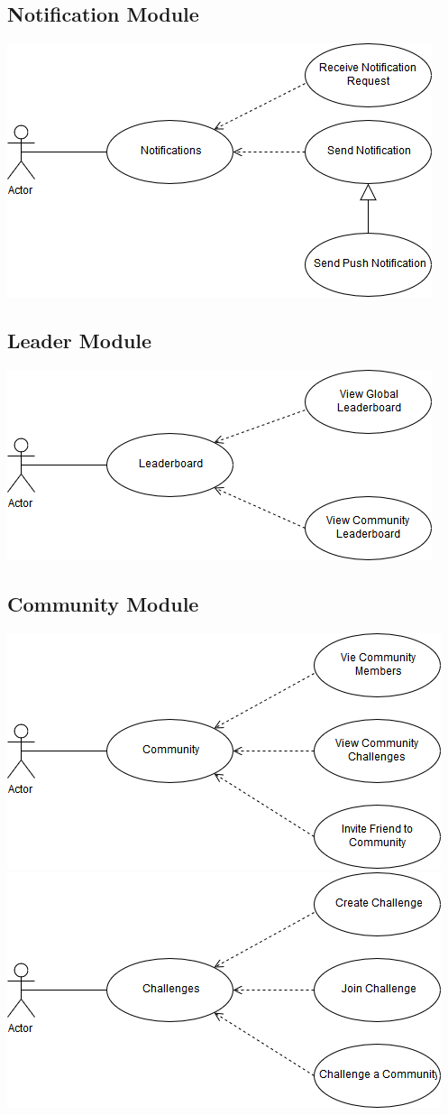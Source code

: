 \documentclass[11pt]{article}
\begin{document}
\subsection{Notification Module}
\includegraphics[width=0.7\linewidth]{images/Notification.png}\\[1cm]
\subsection{Leader Module}
\includegraphics[width=0.7\linewidth]{images/Leaderboard.png}\\[1cm]
\subsection{Community Module}
\includegraphics[width=0.7\linewidth]{images/Community1.png}\\[1cm]
\includegraphics[width=0.7\linewidth]{images/Community2.png}\\[1cm]
\end{document}
